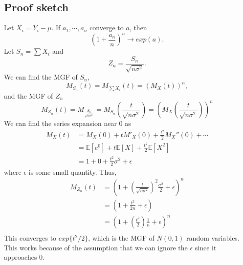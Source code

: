 \documentclass[titlepage, 12pt, leqno]{article}
\begin{document}
\subsection{Proof sketch}
Let $X_{i} = Y_{i}-\mu$. If $a_{1}, \cdots , a_{n}$ converge to $a$, then
\[
\left(1 + \frac{a_{n}}{n}\right)^{n} \rightarrow exp(a).
\]
Let $S_{n} = \sum X_{i}$ and
\[
Z_{n} = \frac{S_{n}}{\sqrt{n\sigma^{2}}}.
\]
We can find the MGF of $S_{n}$,
\[
M_{S_{n}}(t) = M_{\sum X_{i}}(t) = (M_{X}(t))^{n},
\]
and the MGF of $Z_{n}$
\[
M_{Z_{n}}(t) = M_{\frac{S_{n}}{\sqrt{n\sigma^{2}}}} =
M_{S_{n}}\left(\frac{t}{\sqrt{n\sigma^{2}}}\right) = 
\left(M_{X}\left(\frac{t}{\sqrt{n\sigma^{2}}}\right)\right)^{n}
\]
We can find the series expansion near 0 as
\begin{align*}
    M_{X}(t) 
    &= M_{X}(0) + tM'_{X}(0) + \frac{t^{2}}{2}M_{X}''(0) + \cdots  \\
    &= \mathbb{E}[e^{0}] + t\mathbb{E}[X] + \frac{t^{2}}{2}\mathbb{E}[X^{2}]\\
    &= 1 + 0 + \frac{t^{2}}{2}\sigma^{2} + \epsilon
\end{align*}
where $\epsilon$ is some small quantity. Thus,
\begin{align*}
    M_{Z_{n}}(t) 
    &= \left(1 + \left(\frac{t}{\sqrt{n\sigma^{2}}}\right)^{2}
        \frac{\sigma^{2}}{2} + \epsilon \right)^{n}\\
    &= \left(1 + \frac{t^{2}}{2n} + \epsilon\right) \\
    &= \left(1 + \left(\frac{t^{2}}{2}\right)\frac{1}{n} + \epsilon\right)^{n}\\
\end{align*}
This converges to $exp\{t^{2}/2\}$, which is the MGF of $N(0,1)$ random
variables. This works because of the assumption that we can ignore the $\epsilon$
since it approaches 0.
\end{document}
